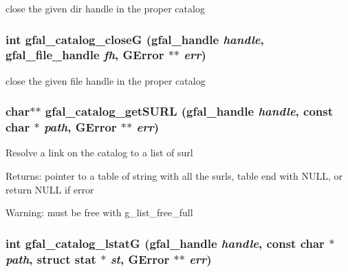 close the given dir handle in the proper catalog 
\subsubsection{\setlength{\rightskip}{0pt plus 5cm}int gfal\_\-catalog\_\-close\-G (gfal\_\-handle {\em handle}, gfal\_\-file\_\-handle {\em fh}, GError $\ast$$\ast$ {\em err})}\label{gfal__common__catalog_8h_27712f4ef0fd4a8d3d5b63b90936d295}


close the given file handle in the proper catalog 
\subsubsection{\setlength{\rightskip}{0pt plus 5cm}char$\ast$$\ast$ gfal\_\-catalog\_\-get\-SURL (gfal\_\-handle {\em handle}, const char $\ast$ {\em path}, GError $\ast$$\ast$ {\em err})}\label{gfal__common__catalog_8h_eeef83dd1c788197ed7ae4a933d8e8d3}


Resolve a link on the catalog to a list of surl \begin{Desc}
\item[Returns:]pointer to a table of string with all the surls, table end with NULL, or return NULL if error \end{Desc}
\begin{Desc}
\item[Warning:]must be free with g\_\-list\_\-free\_\-full \end{Desc}
\subsubsection{\setlength{\rightskip}{0pt plus 5cm}int gfal\_\-catalog\_\-lstat\-G (gfal\_\-handle {\em handle}, const char $\ast$ {\em path}, struct stat $\ast$ {\em st}, GError $\ast$$\ast$ {\em err})}\label{gfal__common__catalog_8h_1ad1b1f96272dbf43a15e7ea5d35389d}


